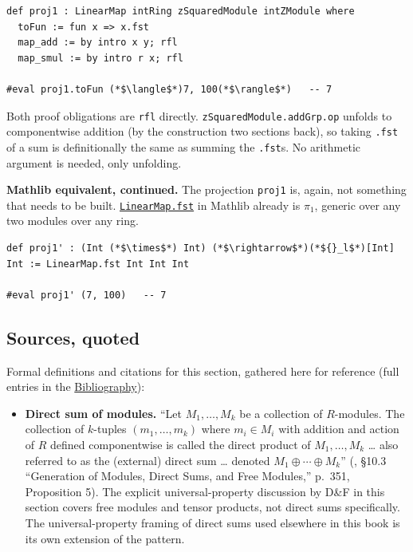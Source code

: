 \begin{lstlisting}
def proj1 : LinearMap intRing zSquaredModule intZModule where
  toFun := fun x => x.fst
  map_add := by intro x y; rfl
  map_smul := by intro r x; rfl

#eval proj1.toFun (*$\langle$*)7, 100(*$\rangle$*)   -- 7
\end{lstlisting}

Both proof obligations are \texttt{rfl} directly. \texttt{zSquaredModule.addGrp.op} unfolds to componentwise addition (by the construction two sections back), so taking \texttt{.fst} of a sum is definitionally the same as summing the \texttt{.fst}s. No arithmetic argument is needed, only unfolding.

\textbf{Mathlib equivalent, continued.} The projection \texttt{proj1} is, again, not something that needs to be built. \href{https://loogle.lean-lang.org/?q=LinearMap.fst}{\texttt{LinearMap.fst}} in Mathlib already is \(\pi_1\), generic over any two modules over any ring.

\begin{lstlisting}
def proj1' : (Int (*$\times$*) Int) (*$\rightarrow$*)(*${}_l$*)[Int] Int := LinearMap.fst Int Int Int

#eval proj1' (7, 100)   -- 7
\end{lstlisting}

\subsection{Sources, quoted}\label{sec:11-modules:06-direct-sums:3}

Formal definitions and citations for this section, gathered here for reference (full entries in the \hyperref[sec:root:bibliography:1]{Bibliography}):

\begin{itemize}
\tightlist
\item
  \textbf{Direct sum of modules.} ``Let \(M_1, \ldots, M_k\) be a collection of \(R\)-modules. The collection of \(k\)-tuples \((m_1, \ldots, m_k)\) where \(m_i \in M_i\) with addition and action of \(R\) defined componentwise is called the direct product of \(M_1, \ldots, M_k\) \ldots{} also referred to as the (external) direct sum \ldots{} denoted \(M_1 \oplus \cdots \oplus M_k\)'' (\cite{DummitFoote2003}, §10.3 ``Generation of Modules, Direct Sums, and Free Modules,'' p.~351, Proposition 5). The explicit universal-property discussion by D\&F in this section covers free modules and tensor products, not direct sums specifically. The universal-property framing of direct sums used elsewhere in this book is its own extension of the pattern.
\end{itemize}
